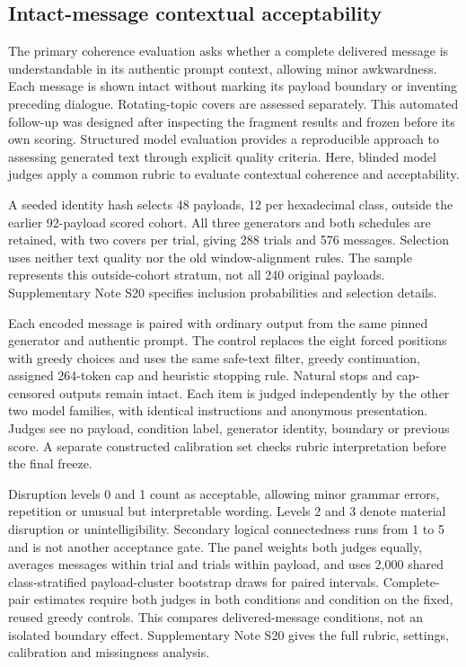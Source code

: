 \subsection*{Intact-message contextual acceptability}\label{sec:v4-contextual-method}\label{sec:v4-boundary-method}
The primary coherence evaluation asks whether a complete delivered message is understandable in its authentic prompt context, allowing minor awkwardness. Each message is shown intact without marking its payload boundary or inventing preceding dialogue. Rotating-topic covers are assessed separately. This automated follow-up was designed after inspecting the fragment results and frozen before its own scoring. Structured model evaluation provides a reproducible approach to assessing generated text through explicit quality criteria\cite{Liu2023GEval}. Here, blinded model judges apply a common rubric to evaluate contextual coherence and acceptability.

A seeded identity hash selects 48 payloads, 12 per hexadecimal class, outside the earlier 92-payload scored cohort. All three generators and both schedules are retained, with two covers per trial, giving 288 trials and 576 messages. Selection uses neither text quality nor the old window-alignment rules. The sample represents this outside-cohort stratum, not all 240 original payloads. Supplementary Note S20 specifies inclusion probabilities and selection details.

Each encoded message is paired with ordinary output from the same pinned generator and authentic prompt. The control replaces the eight forced positions with greedy choices and uses the same safe-text filter, greedy continuation, assigned 264-token cap and heuristic stopping rule. Natural stops and cap-censored outputs remain intact. Each item is judged independently by the other two model families, with identical instructions and anonymous presentation. Judges see no payload, condition label, generator identity, boundary or previous score. A separate constructed calibration set checks rubric interpretation before the final freeze.

Disruption levels 0 and 1 count as acceptable, allowing minor grammar errors, repetition or unusual but interpretable wording. Levels 2 and 3 denote material disruption or unintelligibility. Secondary logical connectedness runs from 1 to 5 and is not another acceptance gate. The panel weights both judges equally, averages messages within trial and trials within payload, and uses 2,000 shared class-stratified payload-cluster bootstrap draws for paired intervals. Complete-pair estimates require both judges in both conditions and condition on the fixed, reused greedy controls. This compares delivered-message conditions, not an isolated boundary effect. Supplementary Note S20 gives the full rubric, settings, calibration and missingness analysis.
